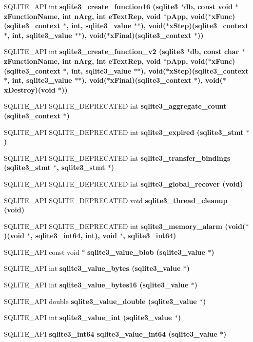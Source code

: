 \begin{CompactItemize}
\item 
SQLITE\_\-API int \bf{sqlite3\_\-create\_\-function16} (\bf{sqlite3} $\ast$\bf{db}, const void $\ast$z\-Function\-Name, int n\-Arg, int e\-Text\-Rep, void $\ast$p\-App, void($\ast$x\-Func)(\bf{sqlite3\_\-context} $\ast$, int, \bf{sqlite3\_\-value} $\ast$$\ast$), void($\ast$x\-Step)(\bf{sqlite3\_\-context} $\ast$, int, \bf{sqlite3\_\-value} $\ast$$\ast$), void($\ast$x\-Final)(\bf{sqlite3\_\-context} $\ast$))
\item 
SQLITE\_\-API int \bf{sqlite3\_\-create\_\-function\_\-v2} (\bf{sqlite3} $\ast$\bf{db}, const char $\ast$z\-Function\-Name, int n\-Arg, int e\-Text\-Rep, void $\ast$p\-App, void($\ast$x\-Func)(\bf{sqlite3\_\-context} $\ast$, int, \bf{sqlite3\_\-value} $\ast$$\ast$), void($\ast$x\-Step)(\bf{sqlite3\_\-context} $\ast$, int, \bf{sqlite3\_\-value} $\ast$$\ast$), void($\ast$x\-Final)(\bf{sqlite3\_\-context} $\ast$), void($\ast$x\-Destroy)(void $\ast$))
\item 
SQLITE\_\-API SQLITE\_\-DEPRECATED int \bf{sqlite3\_\-aggregate\_\-count} (\bf{sqlite3\_\-context} $\ast$)
\item 
SQLITE\_\-API SQLITE\_\-DEPRECATED int \bf{sqlite3\_\-expired} (\bf{sqlite3\_\-stmt} $\ast$)
\item 
SQLITE\_\-API SQLITE\_\-DEPRECATED int \bf{sqlite3\_\-transfer\_\-bindings} (\bf{sqlite3\_\-stmt} $\ast$, \bf{sqlite3\_\-stmt} $\ast$)
\item 
SQLITE\_\-API SQLITE\_\-DEPRECATED int \bf{sqlite3\_\-global\_\-recover} (void)
\item 
SQLITE\_\-API SQLITE\_\-DEPRECATED void \bf{sqlite3\_\-thread\_\-cleanup} (void)
\item 
SQLITE\_\-API SQLITE\_\-DEPRECATED int \bf{sqlite3\_\-memory\_\-alarm} (void($\ast$)(void $\ast$, \bf{sqlite3\_\-int64}, int), void $\ast$, \bf{sqlite3\_\-int64})
\item 
SQLITE\_\-API const void $\ast$ \bf{sqlite3\_\-value\_\-blob} (\bf{sqlite3\_\-value} $\ast$)
\item 
SQLITE\_\-API int \bf{sqlite3\_\-value\_\-bytes} (\bf{sqlite3\_\-value} $\ast$)
\item 
SQLITE\_\-API int \bf{sqlite3\_\-value\_\-bytes16} (\bf{sqlite3\_\-value} $\ast$)
\item 
SQLITE\_\-API double \bf{sqlite3\_\-value\_\-double} (\bf{sqlite3\_\-value} $\ast$)
\item 
SQLITE\_\-API int \bf{sqlite3\_\-value\_\-int} (\bf{sqlite3\_\-value} $\ast$)
\item 
SQLITE\_\-API \bf{sqlite3\_\-int64} \bf{sqlite3\_\-value\_\-int64} (\bf{sqlite3\_\-value} $\ast$)

\end{CompactItemize}
